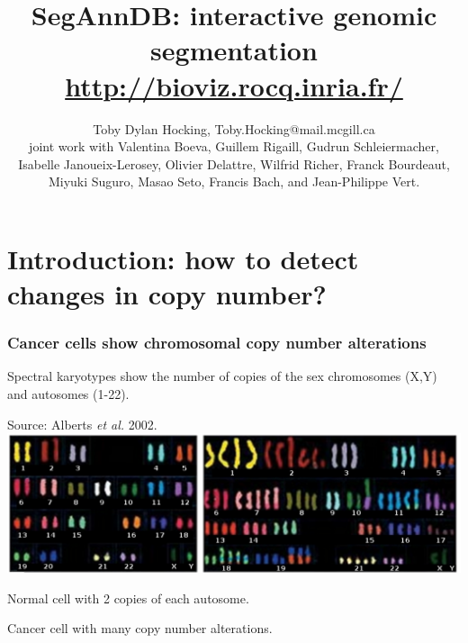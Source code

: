\documentclass{beamer}
\begin{document}
\title{SegAnnDB: interactive genomic segmentation\\
\url{http://bioviz.rocq.inria.fr/}}
\newcommand{\acknowledge}[2]{\parbox{1.5in}{ \centering
\texttt{[image: photos/\#1]}\\
#2
}}
\author{
Toby Dylan Hocking, Toby.Hocking@mail.mcgill.ca\\
\vskip 1cm
joint work with Valentina Boeva, Guillem Rigaill, Gudrun Schleiermacher, Isabelle Janoueix-Lerosey, Olivier Delattre, Wilfrid Richer, Franck Bourdeaut, Miyuki Suguro, Masao Seto, Francis Bach, and Jean-Philippe Vert.
}


\maketitle

\section{Introduction: how to detect changes in copy number?}

\begin{frame}
  \frametitle{Cancer cells show chromosomal copy number alterations}
  Spectral karyotypes show the number of copies of the sex chromosomes
  (X,Y) and autosomes (1-22). 

  Source: Alberts \emph{et al.} 2002.
\vskip 0.1in
  \includegraphics[width=\textwidth]{Karyo-both}
\vskip 0.1in
  \begin{minipage}{0.4\linewidth}
    Normal cell with 2 copies of each autosome.
  \end{minipage}
\linewidth
  \begin{minipage}{0.4\linewidth}
Cancer cell with many copy number alterations.
  \end{minipage}
\end{frame}
\end{document}
